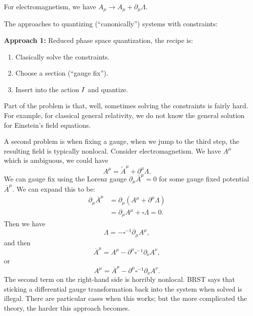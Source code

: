 For electromagnetism, we have $A_{\mu}\to
A_{\mu}+\partial_{\mu}\Lambda$.

The approaches to quantizing (``canonically'') systems with constraints:

\bigbreak
\textbf{Approach 1:} Reduced phase space quantization, the recipe is:
\begin{enumerate}[nosep,label=(\arabic*)]
\item Clasically solve the constraints.
\item Choose a section (``gauge fix'').
\item Insert into the action $I$ and quantize.
\end{enumerate}
Part of the problem is that, well, sometimes solving the constraints
is fairly hard. For example, for classical general relativity, we do
not know the general solution for Einstein's field equations.

A second problem is when fixing a gauge, when we jump to the third step,
the resulting field is typically nonlocal. Consider electromagnetism. We
have $A^{\mu}$ which is ambiguous, we could have
\begin{equation}
A^{\mu} = \widetilde{A}^{\mu} + \partial^{\mu}\Lambda.
\end{equation}
We can gauge fix using the Lorenz gauge
$\partial_{\mu}\overline{A}^{\mu}=0$ for some gauge fixed potential
$\overline{A}^{\mu}$. We can expand this to be:
\begin{subequations}
\begin{align}
\partial_{\mu}\overline{A}^{\mu}
&= \partial_{\mu}(A^{\mu} + \partial^{\mu}\Lambda)\\
&=\partial_{\mu}A^{\mu} + \square\Lambda = 0.
\end{align}
\end{subequations}
Then we have
\begin{equation}
\Lambda = -\square^{-1}\partial_{\mu}A^{\mu},
\end{equation}
and then
\begin{equation}
\overline{A}^{\mu} = A^{\mu} - \partial^{\mu}\square^{-1}\partial_{\nu}A^{\nu},
\end{equation}
or
\begin{equation}
A^{\mu} = \overline{A}^{\mu}  - \partial^{\mu}\square^{-1}\partial_{\nu}A^{\nu}.
\end{equation}
The second term on the right-hand side is horribly nonlocal. BRST says
that sticking a differential gauge transformation back into the system
when solved is illegal. There are particular cases when this works; but
the more complicated the theory, the harder this approach becomes.


